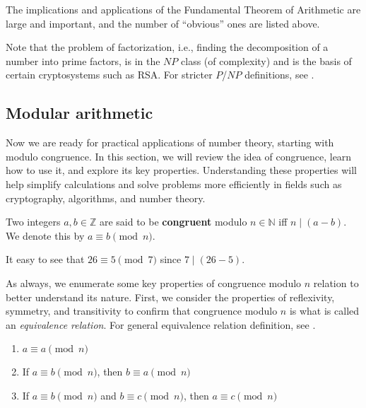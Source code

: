 \documentclass[../lecture-notes-148x210.tex]{subfiles}
\begin{document}
The implications and applications of the Fundamental Theorem of Arithmetic are
large and important, and the number of ``obvious'' ones are listed above. 
\begin{remark}
    Note that the problem of factorization, i.e., finding the decomposition of a
number into prime factors, is in the $NP$ class (of complexity) and is the basis
of certain cryptosystems such as RSA. For stricter $P$/$NP$ definitions, see 
.
\end{remark}

\subsection{Modular arithmetic}

Now we are ready for practical applications of number theory, starting with modulo congruence.
In this section, we will review the idea of congruence, learn how to use it, and explore
its key properties. Understanding these properties will help simplify calculations and solve 
problems more efficiently in fields such as cryptography, algorithms, and number theory.

\begin{definition}
    Two integers $a, b \in \mathbb{Z}$ are said to be \textbf{congruent} modulo
    $n \in \mathbb{N}$ iff $n \mid (a-b)$. We denote this by $a \equiv b
    \pmod{n}$.
\end{definition}

\begin{example}
    It easy to see that $26 \equiv 5 \pmod{7}$ since $7 \mid (26-5)$. 
\end{example}

As always, we enumerate some key properties of congruence modulo $n$ relation to 
better understand its nature. First, we consider the properties of reflexivity,
symmetry, and transitivity to confirm that congruence modulo $n$ is what 
is called an \textit{equivalence relation}. For general 
equivalence relation definition, see .

\begin{lemma} 
    \hfill
    \begin{enumerate}
        \item $a \equiv a \pmod{n}$
        \item If $a \equiv b \pmod{n}$, then $b \equiv a \pmod{n}$
        \item If $a \equiv b \pmod{n}$ and $b \equiv c \pmod{n}$, then $a \equiv c \pmod{n}$
    \end{enumerate}
\end{lemma}
\end{document}
